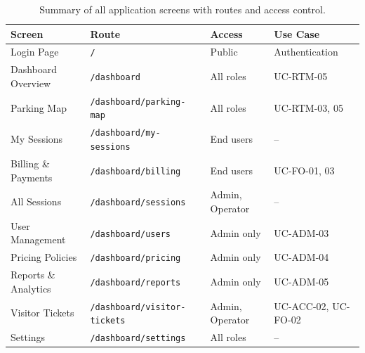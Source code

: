 \documentclass[12pt,a4paper]{article}
\begin{document}
\begin{table}[H]
\centering
\small
\begin{tabular}{llll}
\toprule
\textbf{Screen} & \textbf{Route} & \textbf{Access} & \textbf{Use Case} \\
\midrule
Login Page & \texttt{/} & Public & Authentication \\
Dashboard Overview & \texttt{/dashboard} & All roles & UC-RTM-05 \\
Parking Map & \texttt{/dashboard/parking-map} & All roles & UC-RTM-03, 05 \\
My Sessions & \texttt{/dashboard/my-sessions} & End users & -- \\
Billing \& Payments & \texttt{/dashboard/billing} & End users & UC-FO-01, 03 \\
All Sessions & \texttt{/dashboard/sessions} & Admin, Operator & -- \\
User Management & \texttt{/dashboard/users} & Admin only & UC-ADM-03 \\
Pricing Policies & \texttt{/dashboard/pricing} & Admin only & UC-ADM-04 \\
Reports \& Analytics & \texttt{/dashboard/reports} & Admin only & UC-ADM-05 \\
Visitor Tickets & \texttt{/dashboard/visitor-tickets} & Admin, Operator & UC-ACC-02, UC-FO-02 \\
Settings & \texttt{/dashboard/settings} & All roles & -- \\
\bottomrule
\end{tabular}
\caption{Summary of all application screens with routes and access control.}
\label{tab:screens}
\end{table}
\end{document}
